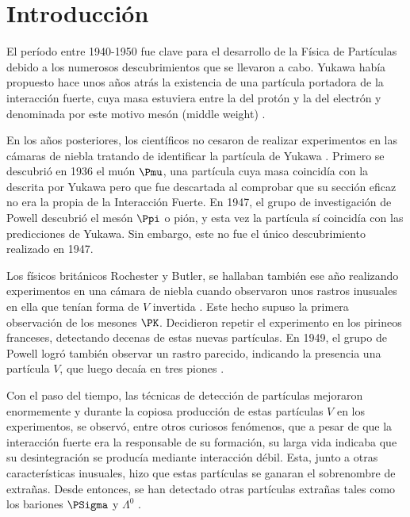 \renewcommand{\listtablename}{Índice de tablas}
\renewcommand{\tablename}{Tabla}

\chapter{Introducción}\label{cap:intro}
El período entre 1940-1950 fue clave para el desarrollo de la Física de Partículas debido a los numerosos descubrimientos que se llevaron a cabo. Yukawa había propuesto hace unos años atrás la existencia de una partícula portadora de la interacción fuerte, cuya masa estuviera entre la del protón y la del electrón y denominada por este motivo mesón (middle weight) \cite{Griffiths2008}.
 
En los años posteriores, los científicos no cesaron de realizar experimentos en las cámaras de niebla tratando de identificar la partícula de Yukawa \cite{Lattes}. Primero se descubrió en 1936 el muón $\Pmu$, una partícula cuya masa coincidía con la descrita por Yukawa pero que fue descartada al comprobar que su sección eficaz no era la propia de la Interacción Fuerte. En 1947, el grupo de investigación de Powell descubrió el mesón $\Ppi$ o pión, y esta vez la partícula sí coincidía con las predicciones de Yukawa. Sin embargo, este no fue el único descubrimiento realizado en 1947.

Los físicos británicos Rochester y Butler, se hallaban también ese año realizando experimentos en una cámara de niebla cuando observaron unos rastros inusuales en ella que tenían forma de $V$ invertida \cite{Nature1}. Este hecho supuso la primera observación de los mesones $\PK$. Decidieron repetir el experimento en los pirineos franceses, detectando decenas de estas nuevas partículas. En 1949, el grupo de Powell logró también observar un rastro parecido, indicando la presencia una partícula $V$, que luego decaía en tres piones \cite{Powell}. 

Con el paso del tiempo, las técnicas de detección de partículas mejoraron enormemente y durante la copiosa producción de estas partículas $V$ en los experimentos, se observó, entre otros curiosos fenómenos, que a pesar de que la interacción fuerte era la responsable de su formación, su larga vida indicaba que su desintegración se producía mediante interacción débil. Esta, junto a otras características inusuales, hizo que estas partículas se ganaran el sobrenombre de extrañas. Desde entonces, se han detectado otras partículas extrañas tales como los bariones $\PSigma$ y $\Lambda^0$ \cite{Bardeen2012}.

